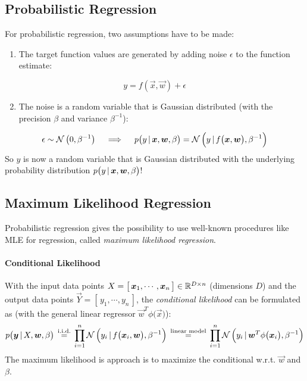 		\subsection{Probabilistic Regression}
			For probabilistic regression, two assumptions have to be made:
			\begin{enumerate}
				\item The target function values are generated by adding noise \(\epsilon\) to the function estimate:
			\end{enumerate}
			\begin{equation}
				y = f(\vec{x}, \vec{w}) + \epsilon
			\end{equation}
			\begin{enumerate} \setcounter{enumi}{1}
				\item The noise is a random variable that is Gaussian distributed (with the precision \( \beta \) and variance \( \beta^{-1} \)):
			\end{enumerate}
			\begin{equation}
				\epsilon \sim \mathcal{N}\,\big(0, \beta^{-1}\big) \quad\implies\quad p\big(y \,\vert\, \bm{x}, \bm{w}, \beta\big) = \mathcal{N}\,\Big(y \,\vert\, f\big(\bm{x}, \bm{w}\big), \beta^{-1}\Big)
			\end{equation}
			So \(y\) is now a random variable that is Gaussian distributed with the underlying probability distribution \( p\big(y \,\vert\, \bm{x}, \bm{w}, \beta\big) \)!

		\subsection{Maximum Likelihood Regression}
			Probabilistic regression gives the possibility to use well-known procedures like MLE for regression, called \emph{maximum likelihood regression}.

			\paragraph{Conditional Likelihood}
				With the input data points \( X = \big[\, \bm{x}_1, \cdots, \bm{x}_n \,\big] \in \mathbb{R}^{D \times n} \) (dimensions \(D\)) and the output data points \( \vec{Y} = [\, y_1, \cdots, y_n \,] \), the \emph{conditional likelihood} can be formulated as (with the general linear regressor \( \vec{w}^T \phi\big(\vec{x}\big) \)):
				\begin{equation}
					p\big(\bm{y} \,\vert\, X, \bm{w}, \beta\big) \,\overset{\textrm{i.i.d.}}{=}\, \prod_{i = 1}^{n} \mathcal{N}\,\Big(y_i \,\vert\, f\big(\bm{x}_i, \bm{w}\big), \beta^{-1}\Big) \,\overset{\textrm{linear model}}{=}\, \prod_{i = 1}^{n} \mathcal{N}\,\Big(y_i \,\vert\, \bm{w}^T \phi\big(\bm{x}_i\big), \beta^{-1}\Big)
				\end{equation}
				The maximum likelihood is approach is to maximize the conditional w.r.t. \(\vec{w}\) and \(\beta\).

